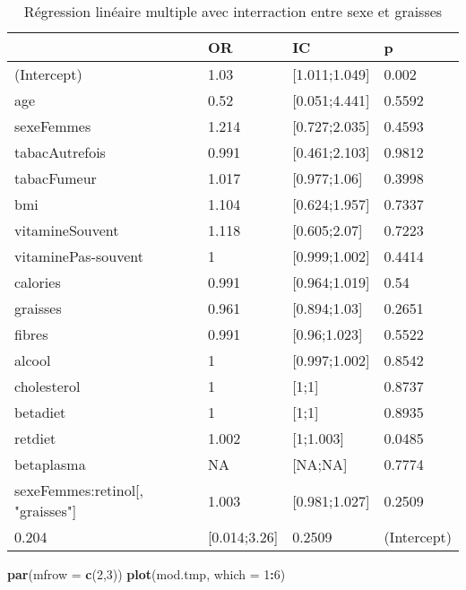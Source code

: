 \documentclass[]{article}
\newenvironment{Shaded}{\begin{snugshade}}{\end{snugshade}}
\newcommand{\KeywordTok}[1]{\textcolor[rgb]{0.13,0.29,0.53}{\textbf{#1}}}
\newcommand{\DataTypeTok}[1]{\textcolor[rgb]{0.13,0.29,0.53}{#1}}
\newcommand{\DecValTok}[1]{\textcolor[rgb]{0.00,0.00,0.81}{#1}}
\newcommand{\OperatorTok}[1]{\textcolor[rgb]{0.81,0.36,0.00}{\textbf{#1}}}
\newcommand{\NormalTok}[1]{#1}
\begin{document}
\begin{table}

\caption{\label{tab:unnamed-chunk-84}Régression linéaire multiple avec interraction entre sexe et graisses}
\centering
\begin{tabular}[t]{l|l|l|l}
\hline
  & OR & IC & p\\
\hline
\rowcolor[HTML]{BBD2E1}  (Intercept) & 1.03 & [1.011;1.049] & 0.002\\
\hline
age & 0.52 & [0.051;4.441] & 0.5592\\
\hline
\rowcolor[HTML]{BBD2E1}  sexeFemmes & 1.214 & [0.727;2.035] & 0.4593\\
\hline
tabacAutrefois & 0.991 & [0.461;2.103] & 0.9812\\
\hline
\rowcolor[HTML]{BBD2E1}  tabacFumeur & 1.017 & [0.977;1.06] & 0.3998\\
\hline
bmi & 1.104 & [0.624;1.957] & 0.7337\\
\hline
\rowcolor[HTML]{BBD2E1}  vitamineSouvent & 1.118 & [0.605;2.07] & 0.7223\\
\hline
vitaminePas-souvent & 1 & [0.999;1.002] & 0.4414\\
\hline
\rowcolor[HTML]{BBD2E1}  calories & 0.991 & [0.964;1.019] & 0.54\\
\hline
graisses & 0.961 & [0.894;1.03] & 0.2651\\
\hline
\rowcolor[HTML]{BBD2E1}  fibres & 0.991 & [0.96;1.023] & 0.5522\\
\hline
alcool & 1 & [0.997;1.002] & 0.8542\\
\hline
\rowcolor[HTML]{BBD2E1}  cholesterol & 1 & [1;1] & 0.8737\\
\hline
betadiet & 1 & [1;1] & 0.8935\\
\hline
\rowcolor[HTML]{BBD2E1}  retdiet & 1.002 & [1;1.003] & 0.0485\\
\hline
betaplasma & NA & [NA;NA] & 0.7774\\
\hline
\rowcolor[HTML]{BBD2E1}  sexeFemmes:retinol[, "graisses"] & 1.003 & [0.981;1.027] & 0.2509\\
\hline
0.204 & [0.014;3.26] & 0.2509 & (Intercept)\\
\hline
\end{tabular}
\end{table}

\begin{Shaded}
\begin{Highlighting}[]
\KeywordTok{par}\NormalTok{(}\DataTypeTok{mfrow =} \KeywordTok{c}\NormalTok{(}\DecValTok{2}\NormalTok{,}\DecValTok{3}\NormalTok{))}
\KeywordTok{plot}\NormalTok{(mod.tmp, }\DataTypeTok{which =} \DecValTok{1}\OperatorTok{:}\DecValTok{6}\NormalTok{)}
\end{Highlighting}
\end{Shaded}
\end{document}
